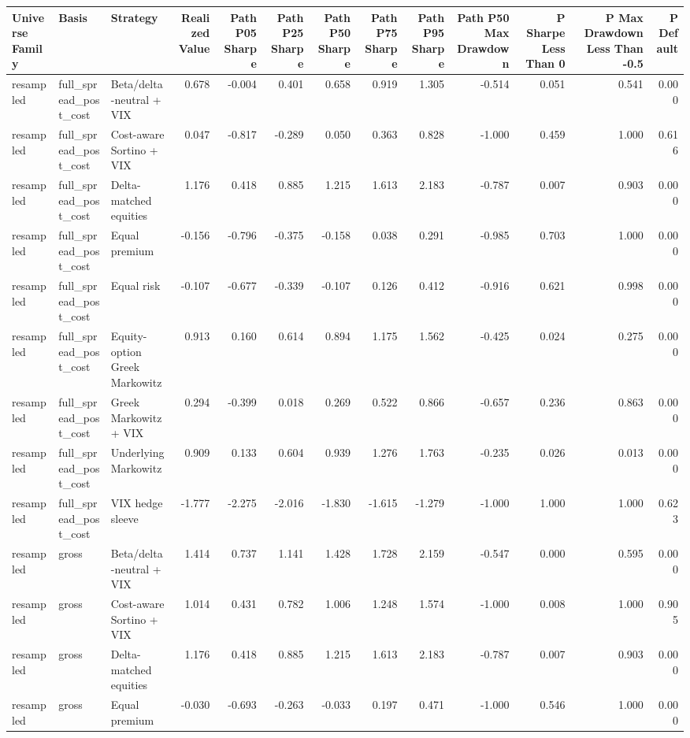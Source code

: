 \begin{tabular}{lllrrrrrrrrrr}
\toprule
Universe Family & Basis & Strategy & Realized Value & Path P05 Sharpe & Path P25 Sharpe & Path P50 Sharpe & Path P75 Sharpe & Path P95 Sharpe & Path P50 Max Drawdown & P Sharpe Less Than 0 & P Max Drawdown Less Than -0.5 & P Default \\
\midrule
resampled & full\_spread\_post\_cost & Beta/delta-neutral + VIX & 0.678 & -0.004 & 0.401 & 0.658 & 0.919 & 1.305 & -0.514 & 0.051 & 0.541 & 0.000 \\
resampled & full\_spread\_post\_cost & Cost-aware Sortino + VIX & 0.047 & -0.817 & -0.289 & 0.050 & 0.363 & 0.828 & -1.000 & 0.459 & 1.000 & 0.616 \\
resampled & full\_spread\_post\_cost & Delta-matched equities & 1.176 & 0.418 & 0.885 & 1.215 & 1.613 & 2.183 & -0.787 & 0.007 & 0.903 & 0.000 \\
resampled & full\_spread\_post\_cost & Equal premium & -0.156 & -0.796 & -0.375 & -0.158 & 0.038 & 0.291 & -0.985 & 0.703 & 1.000 & 0.000 \\
resampled & full\_spread\_post\_cost & Equal risk & -0.107 & -0.677 & -0.339 & -0.107 & 0.126 & 0.412 & -0.916 & 0.621 & 0.998 & 0.000 \\
resampled & full\_spread\_post\_cost & Equity-option Greek Markowitz & 0.913 & 0.160 & 0.614 & 0.894 & 1.175 & 1.562 & -0.425 & 0.024 & 0.275 & 0.000 \\
resampled & full\_spread\_post\_cost & Greek Markowitz + VIX & 0.294 & -0.399 & 0.018 & 0.269 & 0.522 & 0.866 & -0.657 & 0.236 & 0.863 & 0.000 \\
resampled & full\_spread\_post\_cost & Underlying Markowitz & 0.909 & 0.133 & 0.604 & 0.939 & 1.276 & 1.763 & -0.235 & 0.026 & 0.013 & 0.000 \\
resampled & full\_spread\_post\_cost & VIX hedge sleeve & -1.777 & -2.275 & -2.016 & -1.830 & -1.615 & -1.279 & -1.000 & 1.000 & 1.000 & 0.623 \\
resampled & gross & Beta/delta-neutral + VIX & 1.414 & 0.737 & 1.141 & 1.428 & 1.728 & 2.159 & -0.547 & 0.000 & 0.595 & 0.000 \\
resampled & gross & Cost-aware Sortino + VIX & 1.014 & 0.431 & 0.782 & 1.006 & 1.248 & 1.574 & -1.000 & 0.008 & 1.000 & 0.905 \\
resampled & gross & Delta-matched equities & 1.176 & 0.418 & 0.885 & 1.215 & 1.613 & 2.183 & -0.787 & 0.007 & 0.903 & 0.000 \\
resampled & gross & Equal premium & -0.030 & -0.693 & -0.263 & -0.033 & 0.197 & 0.471 & -1.000 & 0.546 & 1.000 & 0.000 \\

\end{tabular}
